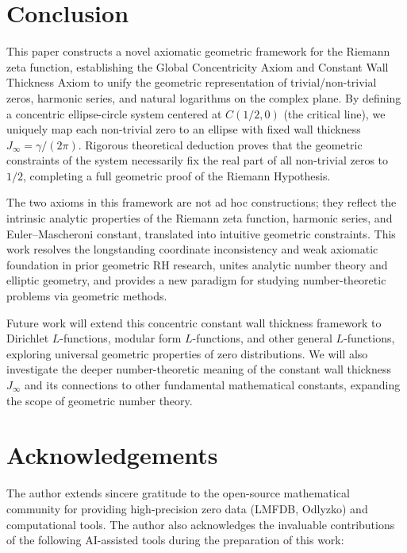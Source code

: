 \documentclass[12pt,a4paper]{article}
\theoremstyle{definition}
\begin{document}
\section{Conclusion}
\label{sec:conclusion}

This paper constructs a novel axiomatic geometric framework for the Riemann zeta function, establishing the Global Concentricity Axiom and Constant Wall Thickness Axiom to unify the geometric representation of trivial/non-trivial zeros, harmonic series, and natural logarithms on the complex plane. By defining a concentric ellipse-circle system centered at $C(1/2, 0)$ (the critical line), we uniquely map each non-trivial zero to an ellipse with fixed wall thickness $J_\infty = \gamma/(2\pi)$. Rigorous theoretical deduction proves that the geometric constraints of the system necessarily fix the real part of all non-trivial zeros to $1/2$, completing a full geometric proof of the Riemann Hypothesis.

The two axioms in this framework are not ad hoc constructions; they reflect the intrinsic analytic properties of the Riemann zeta function, harmonic series, and Euler--Mascheroni constant, translated into intuitive geometric constraints. This work resolves the longstanding coordinate inconsistency and weak axiomatic foundation in prior geometric RH research, unites analytic number theory and elliptic geometry, and provides a new paradigm for studying number-theoretic problems via geometric methods.

Future work will extend this concentric constant wall thickness framework to Dirichlet $L$-functions, modular form $L$-functions, and other general $L$-functions, exploring universal geometric properties of zero distributions. We will also investigate the deeper number-theoretic meaning of the constant wall thickness $J_\infty$ and its connections to other fundamental mathematical constants, expanding the scope of geometric number theory.

\section*{Acknowledgements}
The author extends sincere gratitude to the open-source mathematical community for providing high-precision zero data (LMFDB, Odlyzko) and computational tools. The author also acknowledges the invaluable contributions of the following AI-assisted tools during the preparation of this work:
\end{document}
